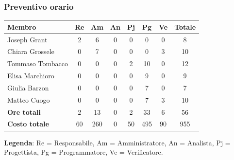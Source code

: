 \documentclass[11pt,a4paper]{article}
\begin{document}
\subsubsection{Preventivo orario}
\begin{center}
    \begin{tabular}{|l|c|c|c|c|c|c|c|}
        \hline
        \textbf{Membro} & \textbf{Re} & \textbf{Am} & \textbf{An} & \textbf{Pj} & \textbf{Pg} & \textbf{Ve} & \textbf{Totale} \\
        \hline
        Joseph Grant & 2 & 6 & 0 & 0 & 0 & 0 & 8 \\
        \hline
        Chiara Grossele & 0 & 7 & 0 & 0 & 0 & 3 & 10 \\
        \hline
        Tommaso Tombacco & 0 & 0 & 0 & 2 & 10 & 0 & 12 \\
        \hline
        Elisa Marchioro & 0 & 0 & 0 & 0 & 9 & 0 & 9 \\
        \hline
        Giulia Barzon & 0 & 0 & 0 & 0 & 7 & 0 & 7 \\
        \hline
        Matteo Cuogo & 0 & 0 & 0 & 0 & 7 & 3 & 10 \\
        \hline
        \textbf{Ore totali} & 2 & 13 & 0 & 2 & 33 & 6 & 56 \\
        \hline
        \textbf{Costo totale} & 60 & 260 & 0 & 50 & 495 & 90 & 955 \\
        \hline
    \end{tabular}
\end{center}

\noindent \textbf{Legenda}: Re = Responsabile, Am = Amministratore, An = Analista, Pj = Progettista, Pg = Programmatore, Ve = Verificatore.
\end{document}

